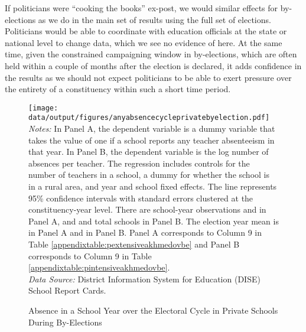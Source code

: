 \documentclass[hidelinks, 12pt, article, oneside]{memoir}
\begin{document}
If politicians were ``cooking the books'' ex-post, we would similar effects for by-elections as we do in the main set of results using the full set of elections. Politicians would be able to coordinate with education officials at the state or national level to change data, which we see no evidence of here. At the same time, given the constrained campaigning window in by-elections, which are often held within a couple of months after the election is declared, it adds confidence in the results as we should not expect politicians to be able to exert pressure over the entirety of a constituency within such a short time period.

\begin{figure}[htbp]
\caption{Absence in a School Year over the Electoral Cycle in Private Schools During By-Elections\label{fig:pbeextensiveakhmedov}}
\centering
\begin{minipage}{6.5in}
    \texttt{[image: data/output/figures/anyabsencecycleprivatebyelection.pdf]}
    \tiny \emph{Notes:} In Panel A, the dependent variable is a dummy variable that takes the value of one if a school reports any teacher absenteeism in that year. In Panel B, the dependent variable is the log number of absences per teacher. The regression includes controls for the number of teachers in a school, a dummy for whether the school is in a rural area, and year and school fixed effects.  The line represents 95\% confidence intervals with standard errors clustered at the constituency-year level.  There are  school-year observations and  in Panel A, and  and  total schools in Panel B. The election year mean is  in Panel A and  in Panel B.  Panel A corresponds to Column 9 in Table \ref{appendixtable:pextensiveakhmedovbe} and Panel B corresponds to Column 9 in Table \ref{appendixtable:pintensiveakhmedovbe}.\\
    \emph{Data Source:} District Information System for Education (DISE) School Report Cards.
\end{minipage}
\end{figure}




\end{document}
